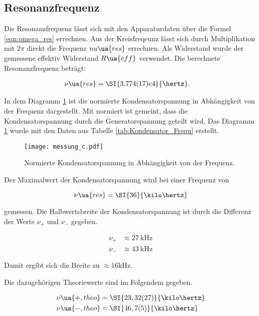\subsection{Resonanzfrequenz}

Die Resonanzfrequenz lässt sich mit den Apparaturdaten über die Formel \eqref{eqn:omega_res}
errechnen. Aus der Kreisfreqeunz lässt sich durch Multiplikation mit
$2\pi$ direkt die Frequenz $nu\ua{res}$ errechnen.
Als Widerstand wurde der gemessene effektiv Widerstand $R\ua{eff}$
verwendet.
Die berechnete Resonanzfrequenz beträgt:

\begin{align*}
  \nu\ua{res} &= \SI{3.774(17)e4}{\hertz}.
\end{align*}

In dem Diagramm \ref{fig:Kondensator_Frequ} ist die normierte Kondensatorspannung
in Abhängigkeit von der Frequenz dargestellt. Mit normiert ist gemeint, dass die
Kondensatorspannung durch die Generatorspannung geteilt wird.
Das Diagramm \ref{fig:Kondensator_Frequ} wurde mit den Daten aus Tabelle \ref{tab:Kondensator_Frequ}
erstellt.

\begin{figure}
  \centering
  \texttt{[image: messung\_c.pdf]}
  \caption{Normierte Kondensatorspannung in Abhängigkeit von der Frequenz.}
  \label{fig:Kondensator_Frequ}
\end{figure}

Der Maximalwert der Kondensatorspannung wird bei einer Frequenz von

\begin{equation}
  \label{eqn:Resonanzfrequenz}
  \nu\ua{res} = \SI{36}{\kilo\hertz}
\end{equation}

gemessen. Die Halbwertsbreite der Kondensatorspannung ist durch die Differenz der Werte
$\nu_+$ und $\nu_-$ gegeben.

\begin{align*}
  \nu_+ &\approx \SI{27}{\kilo\hertz} \\
  \nu_- &\approx \SI{43}{\kilo\hertz}
\end{align*}

Damit ergibt sich die Breite zu $\approx 16\si{\kilo\hertz}$.

Die dazugehörigen Theoriewerte sind im Folgendem gegeben.

\begin{align*}
  \nu\ua{+,theo} &= \SI{23,32(27)}{\kilo\hertz} \\
  \nu\ua{-,theo} &= \SI{46,7(5)}{\kilo\hertz}
\end{align*}

